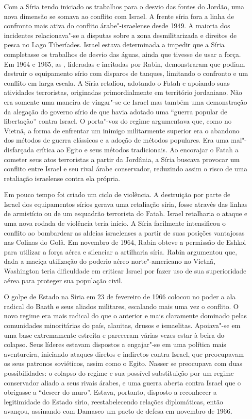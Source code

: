 Com a Síria tendo iniciado os trabalhos para o desvio das fontes
do Jordão, uma nova dimensão se somava ao conflito com Israel. A
frente síria fora a linha de confronto mais ativa do conflito
árabe"-israelense desde 1949. A maioria dos incidentes relacionava"-se a
disputas sobre a zona desmilitarizada e direitos de pesca no Lago
Tiberíades. Israel estava determinada a impedir que a Síria completasse
os trabalhos de desvio das águas, ainda que tivesse de usar a força. Em
1964 e 1965, as , lideradas e incitadas por Rabin, demonstraram que
podiam destruir o equipamento sírio com disparos de tanques, limitando
o confronto e um conflito em larga escala. A Síria retaliou,
adotando o Fatah e apoiando suas atividades terroristas, originadas
primordialmente em território jordaniano. Não era somente uma maneira de
vingar"-se de Israel mas também uma demonstração da alegação do governo
sírio de que havia adotado uma ``guerra popular de libertação'' contra
Israel. O porta"-voz do regime argumentava que, como no Vietnã, a forma
de enfrentar um inimigo militarmente superior era o abandono dos métodos
de guerra clássicos e a adoção de métodos populares. Era uma
mal"-disfarçada crítica ao Egito e seus métodos tradicionais. Ao
encorajar o Fatah a cometer seus atos terroristas a partir da Jordânia, a
Síria buscava provocar um conflito entre Israel e seu rival árabe
conservador, reduzindo assim o risco de uma retaliação israelense contra
ela própria.

Em pouco tempo foi criado um ciclo de violência. A destruição por
parte de Israel dos equipamentos sírios gerava uma retaliação síria, fosse
através das linhas de armistício ou de um esquadrão terrorista do Fatah.
Israel retalharia o ataque e uma nova rodada de violência teria início.
A Síria facilmente intensificou o conflito ao bombardear as aldeias
israelenses a partir de suas posições vantajosas nas Colinas do Golã.
Em novembro de 1964, Rabin obteve a permissão de Eshkol para utilizar a
força aérea e silenciar a artilharia síria. Rabin argumentou que, dada a
maciça utilização do poderio aéreo norte"-americano no Vietnã, Washington
teria dificuldade em criticar Israel por fazer uso de sua superioridade
aérea para proteger sua população civil.

O golpe de Estado na Síria em 23 de fevereiro de 1966 colocou no poder a
ala radical do Baath e seus aliados militares, escalando mais uma vez o
conflito. O novo regime era mais radical do que o anterior
e mais claramente dominado pelas comunidades minoritárias do
país, alauitas, drusos e ismaelitas. Apoiava"-se em uma base extremamente
estreita e pareceram várias vezes estar à beira do colapso. Seus líderes
estavam dispostos a engajar"-se em uma política mais aventureira,
iniciando ataques diretos e indiretos contra Israel, que preocupavam os
seus patronos soviéticos, assim como o Egito. Nasser se preocupava com
duas possibilidades: o colapso do regime e sua possível substituição por
um regime conservador aliado a seus rivais árabes, e uma guerra aberta
contra Israel que o obrigasse a ``descer do muro''. Estava, portanto,
disposto a reconhecer a legitimidade do Estado sírio, reestabelecendo
relações diplomáticas, então avançou, assinando com Damasco um pacto de
defesa em novembro de 1966.

